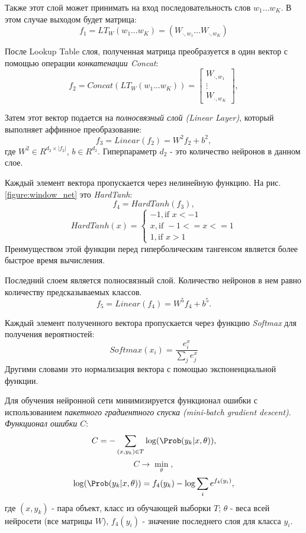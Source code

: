   Также этот слой может принимать на вход последовательность слов $w_1 \ldots w_K$.
  В этом случае выходом будет матрица:
  \[
    f_1 = LT_W(w_1 \ldots w_K) = ( W_{\cdot, w_1} \ldots W_{\cdot, w_K})
  \]

  После Lookup Table слоя, полученная матрица преобразуется в один вектор с
  помощью операции \textit{конкатенации Concat}:
  \[
    f_{2} = Concat(LT_W(w_1 \ldots w_K)) =
      \begin{bmatrix}
        W_{\cdot, w_1} \\
        \vdots \\
        W_{\cdot, w_K}
      \end{bmatrix},
  \]

  Затем этот вектор подается на \textit{полносвязный слой (Linear Layer)}, который
  выполняет аффинное преобразование:
  \begin{equation} \label{formula:linear_layer}
    f_{3} = Linear(f_{2}) = W^2 f_{2} + b^2,
  \end{equation}
  где $W^2 \in R^{d_{2} \times |f_{2}|}$, $b \in R^{d_2}$. Гиперпараметр $d_{2}$ -
  это количество нейронов в данном слое.

  Каждый элемент вектора пропускается через нелинейную функцию. На рис. \ref{figure:window_net}
  это \textit{HardTanh}:
  \[
    f_{4} = HardTanh(f_{3}),
  \]
  \begin{equation} \label{formula:hard_tanh}
  HardTanh(x) =
    \begin{cases}
      -1, \text{if } x < -1 \\
      x, \text{if } -1 <= x <= 1 \\
      1, \text{if } x > 1
    \end{cases}
  \end{equation}
  Преимуществом этой функции перед гиперболическим тангенсом является более быстрое
  время вычисления.

  Последний слоем является полносвязный слой. Количество нейронов в нем
  равно количеству предсказываемых классов.
  \[
    f_5 = Linear(f_4) = W^5 f_{4} + b^5.
  \]

  Каждый элемент полученного вектора пропускается через функцию \textit{Softmax} для получения
  вероятностей:
  \[
    Softmax(x_i) = \frac{e^x_i}{\sum_j e^x_j}
  \]
  Другими словами это нормализация вектора с помощью экспоненциальной функции.

  Для обучения нейронной сети минимизируется функционал ошибки с использованием
  \textit{пакетного градиентного спуска (mini-batch gradient descent)}.
  \textit{Функционал ошибки $C$}:
  \[
    C = - \sum_{(x, y_k) \in T} \log(\Prob(y_k | x, \theta)),
  \]
  \[
    C \rightarrow \min_\theta,
  \]
  \[
    \log(\Prob(y_k | x, \theta)) = f_4(y_k) - \log\sum_i e^{f_4(y_i)},
  \]
  где $(x, y_k)$ - пара объект, класс из обучающей выборки $T$; $\theta$ - веса
  всей нейросети (все матрицы $W$), $f_4(y_i)$ - значение последнего слоя для класса $y_i$.

